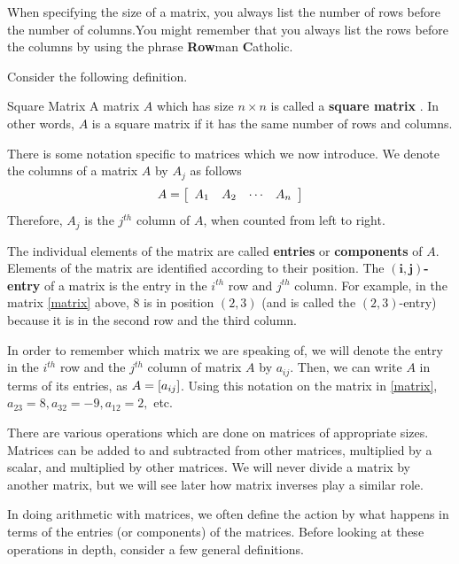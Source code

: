 When specifying the size of a matrix, you always list the number
of rows before the number of columns.You
might remember that you always list the rows before the columns by using the
phrase \textbf{Row}man \textbf{C}atholic. 

Consider the following definition.

\begin{definition}{Square Matrix}\label{def:squarematrix}
A matrix $A$ which has size $n \times n$ is called a \textbf{square matrix} .
In other words, $A$ is a square matrix if it has the same number of rows
and columns.
\end{definition}

There is some notation specific to matrices which we now introduce. We denote the columns of a matrix $A$ 
by $A_{j}$ as follows
\begin{equation*}
A = 
\left[
\begin{array}{rrrr}
A_{1} & A_{2} & \cdots & A_{n}
\end{array}
\right]
\end{equation*}
Therefore, $A_{j}$ is the $j^{th}$ column of $A$, when counted from left to right. 

The individual elements of the matrix are called \textbf{entries}  or \textbf{components}  of $A$. Elements of the matrix
are identified according to their position. The $\mathbf{\left( i, j \right)}$\textbf{-entry} of a matrix is the entry 
in the $i^{th}$ row and $j^{th}$ column. For example, in the matrix \ref{matrix} above,  $8$ is in
position $\left(2,3 \right)$ (and is called the $\left(2,3 \right)$-entry) because it is in the second row and the third column. 

In order to remember which matrix we are speaking of, we 
will denote the entry in the $i^{th}$ row  and the $j^{th}$ column of matrix $A$ by $a_{ij}$. Then, we can write $A$ in terms of its entries,
as $A= \left[ a_{ij} \right]$. Using this notation on the matrix in \ref{matrix},
$a_{23}=8, a_{32}=-9, a_{12}=2,$ etc.

There are various operations which are done on matrices of appropriate
sizes. Matrices can be added to and subtracted from other matrices,
multiplied by a scalar, and multiplied by other matrices. We will
never divide a matrix by another matrix, but we will see later how matrix inverses play a similar role. 

In doing arithmetic with matrices, we often define the action by what
happens in terms of the entries (or components) of the
matrices. Before looking at these operations in depth, consider a few
general definitions.

